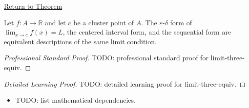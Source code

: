 \newpage
{}
\label{prf:limit-three-equiv}

\begin{remark*}[Return]
\hyperref[cor:limit-three-equiv]{Return to Theorem}
\end{remark*}

\begin{corollary*}
Let $f : A \to \mathbb{R}$ and let $c$ be a cluster point of $A$.
The $\varepsilon$-$\delta$ form of $\lim_{x\to c}f(x)=L$, the
centered interval form, and the sequential form are equivalent descriptions
of the same limit condition.

\smallskip\noindent
\end{corollary*}

\begin{proof}[Professional Standard Proof]
\LRAProofBodyStart
TODO: professional standard proof for limit-three-equiv.
\end{proof}

\begin{proof}[Detailed Learning Proof]
\LRAProofBodyStart
TODO: detailed learning proof for limit-three-equiv.
\end{proof}

\begin{remark*}
\end{remark*}

\begin{dependencies}
\begin{itemize}
  \item TODO: list mathematical dependencies.
\end{itemize}
\end{dependencies}

\clearpage
